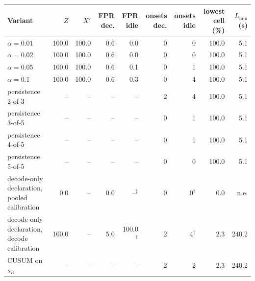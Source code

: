 \begin{tabular}{lrrrrrrrr}
\toprule
Variant & $Z$ & $X'$ & FPR dec. & FPR idle & onsets dec. & onsets idle & lowest cell (\%) & $L_\mathrm{min}$ (s) \\
\midrule
$\alpha = 0.01$ & 100.0 & 100.0 & 0.6 & 0.0 & 0 & 0 & 100.0 & 5.1 \\
$\alpha = 0.02$ & 100.0 & 100.0 & 0.6 & 0.0 & 0 & 0 & 100.0 & 5.1 \\
$\alpha = 0.05$ & 100.0 & 100.0 & 0.6 & 0.1 & 0 & 1 & 100.0 & 5.1 \\
$\alpha = 0.1$ & 100.0 & 100.0 & 0.6 & 0.3 & 0 & 4 & 100.0 & 5.1 \\
\midrule
persistence 2-of-3 & -- & -- & -- & -- & 2 & 4 & 100.0 & 5.1 \\
persistence 3-of-5 & -- & -- & -- & -- & 0 & 1 & 100.0 & 5.1 \\
persistence 4-of-5 & -- & -- & -- & -- & 0 & 1 & 100.0 & 5.1 \\
persistence 5-of-5 & -- & -- & -- & -- & 0 & 0 & 100.0 & 5.1 \\
\midrule
decode-only declaration, pooled calibration & 0.0 & -- & 0.0 & --$^\ddagger$ & 0 & 0$^\dagger$ & 0.0 & n.e. \\
decode-only declaration, decode calibration & 100.0 & -- & 5.0 & 100.0$^\dagger$ & 2 & 4$^\dagger$ & 2.3 & 240.2 \\
CUSUM on $s_R$ & -- & -- & -- & -- & 2 & 2 & 2.3 & 240.2 \\
\bottomrule
\end{tabular}

